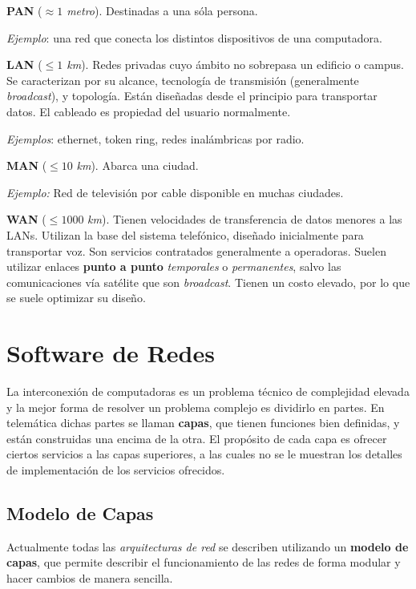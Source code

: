 \documentclass[10pt,a4paper]{article}
\begin{document}
\begin{description}
\item \textbf{PAN} (\textit{$\approx 1$ metro}). Destinadas a una sóla persona.

\textit{Ejemplo}: una red que conecta los distintos dispositivos de una computadora.
\item \textbf{LAN} (\textit{$\leq 1$ km}). Redes privadas cuyo ámbito no sobrepasa un edificio o campus. Se caracterizan por su alcance, tecnología de transmisión (generalmente \textit{broadcast}), y topología. Están diseñadas desde el principio para transportar datos. El cableado es propiedad del usuario normalmente.

\textit{Ejemplos}: ethernet, token ring, redes inalámbricas por radio.

\item \textbf{MAN} ($\leq 10$ \textit{km}). Abarca una ciudad.

\textit{Ejemplo:} Red de televisión por cable disponible en muchas ciudades.

\item \textbf{WAN} ($\leq 1000$ \textit{km}). Tienen velocidades de transferencia de datos menores a las LANs. Utilizan la base del sistema telefónico, diseñado inicialmente para transportar voz. Son servicios contratados generalmente a operadoras. Suelen utilizar enlaces \textbf{punto a punto} \textit{temporales} o \textit{permanentes}, salvo las comunicaciones vía satélite que son \textit{broadcast}. Tienen un costo elevado, por lo que se suele optimizar su diseño.
\end{description}

\section{Software de Redes}

La interconexión de computadoras es un problema técnico de complejidad elevada y la mejor forma de resolver un problema complejo es dividirlo en partes. En telemática dichas partes se llaman \textbf{capas}, que tienen funciones bien definidas, y están construidas una encima de la otra. El propósito de cada capa es ofrecer ciertos servicios a las capas superiores, a las cuales no se le muestran los detalles de implementación de los servicios ofrecidos.

\subsection{Modelo de Capas}
Actualmente todas las \textit{arquitecturas de red} se describen utilizando un \textbf{modelo de capas}, que permite describir el funcionamiento de las redes de forma modular y hacer cambios de manera sencilla.
\end{document}
